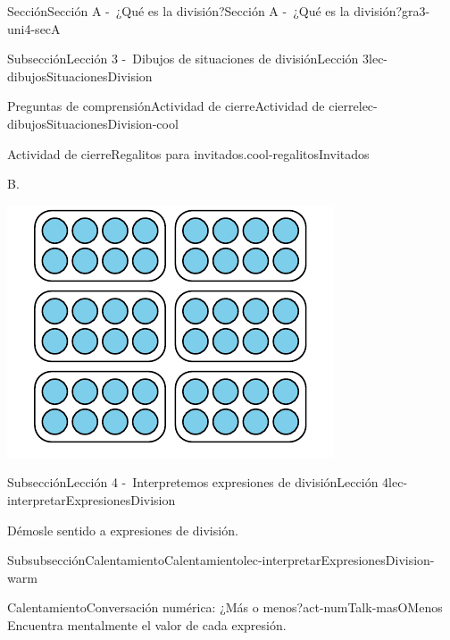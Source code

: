 \documentclass[twoside,10pt,]{article}
\begin{document}
\begin{sectionptx}{Sección}{Sección A -~¿Qué es la división?}{}{Sección A -~¿Qué es la división?}{}{}{gra3-uni4-secA}
\begin{subsectionptx}{Subsección}{Lección 3 -~Dibujos de situaciones de división}{}{Lección 3}{}{}{lec-dibujosSituacionesDivision}
\begin{reading-questions-subsubsection}{Preguntas de comprensión}{Actividad de cierre}{}{Actividad de cierre}{}{}{lec-dibujosSituacionesDivision-cool}
\begin{project}{Actividad de cierre}{Regalitos para invitados.}{cool-regalitosInvitados}
\begin{sidebyside}{2}{0}{0}{0}
\begin{sbspanel}{0.5}
\end{sbspanel}%
\begin{sbspanel}{0.5}%
B.%
\par
\includegraphics[width=\linewidth]{external/svg-source/tikz-file-246307.pdf}
\end{sbspanel}%
\end{sidebyside}%
\end{project}%
\end{reading-questions-subsubsection}
\end{subsectionptx}
%
%
\typeout{************************************************}
\typeout{************************************************}
%
\begin{subsectionptx}{Subsección}{Lección 4 -~Interpretemos expresiones de división}{}{Lección 4}{}{}{lec-interpretarExpresionesDivision}
\begin{introduction}{}%
Démosle sentido a expresiones de división.%
\end{introduction}%
%
%
\typeout{************************************************}
\typeout{************************************************}
%
\begin{subsubsectionptx}{Subsubsección}{Calentamiento}{}{Calentamiento}{}{}{lec-interpretarExpresionesDivision-warm}
\begin{exploration}{Calentamiento}{Conversación numérica: ¿Más o menos?}{act-numTalk-masOMenos}%
Encuentra mentalmente el valor de cada expresión.%
%
\begin{enumerate}[label={\Alph*.}]

\end{enumerate}
\end{exploration}
\end{subsubsectionptx}
\end{subsectionptx}
\end{sectionptx}
\end{document}
